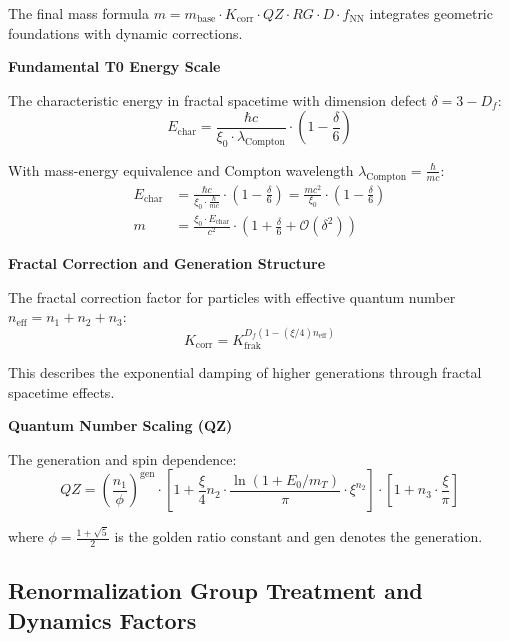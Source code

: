 	The final mass formula $m = m_{\text{base}} \cdot K_{\text{corr}} \cdot QZ \cdot RG \cdot D \cdot f_{\text{NN}}$ integrates geometric foundations with dynamic corrections.
	
	\textbf{Fundamental T0 Energy Scale}
	
	The characteristic energy in fractal spacetime with dimension defect $\delta = 3 - D_f$:
	\begin{equation}
		E_{\text{char}} = \frac{\hbar c}{\xi_0 \cdot \lambda_{\text{Compton}}} \cdot \left(1 - \frac{\delta}{6}\right)
	\end{equation}
	
	With mass-energy equivalence and Compton wavelength $\lambda_{\text{Compton}} = \frac{\hbar}{mc}$:
	\begin{align}
		E_{\text{char}} &= \frac{\hbar c}{\xi_0 \cdot \frac{\hbar}{mc}} \cdot \left(1 - \frac{\delta}{6}\right) = \frac{mc^2}{\xi_0} \cdot \left(1 - \frac{\delta}{6}\right) \\
		m &= \frac{\xi_0 \cdot E_{\text{char}}}{c^2} \cdot \left(1 + \frac{\delta}{6} + \mathcal{O}(\delta^2)\right)
	\end{align}
	
	\textbf{Fractal Correction and Generation Structure}
	
	The fractal correction factor for particles with effective quantum number $n_{\text{eff}} = n_1 + n_2 + n_3$:
	\begin{equation}
		K_{\text{corr}} = K_{\text{frak}}^{D_f (1 - (\xi/4) n_{\text{eff}})}
	\end{equation}
	
	This describes the exponential damping of higher generations through fractal spacetime effects.
	
	\textbf{Quantum Number Scaling (QZ)}
	
	The generation and spin dependence:
	\begin{equation}
		QZ = \left(\frac{n_1}{\phi}\right)^{\text{gen}} \cdot \left[1 + \frac{\xi}{4} n_2 \cdot \frac{\ln(1 + E_0 / m_T)}{\pi} \cdot \xi^{n_2}\right] \cdot \left[1 + n_3 \cdot \frac{\xi}{\pi}\right]
	\end{equation}
	
	where $\phi = \frac{1+\sqrt{5}}{2}$ is the golden ratio constant and $\text{gen}$ denotes the generation.
	
	\subsection{Renormalization Group Treatment and Dynamics Factors}
	
